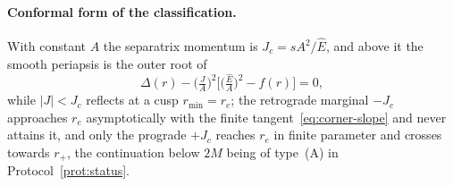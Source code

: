 \documentclass[12pt]{iopart}
\theoremstyle{plain}
\theoremstyle{definition}
\theoremstyle{remark}
\newcommand{\Ehat}{\hat E}
\newcommand{\rp}{r_{+}}
\newcommand{\re}{r_{e}}
\newcommand{\Jc}{J_{c}}
\begin{document}
\paragraph{Conformal form of the classification.} With constant $A$ the separatrix momentum is
$\Jc=sA^2/\Ehat$, and above it the smooth periapsis is the outer root of
\begin{equation}
    \Delta(r)-\Big(\tfrac{J}{A}\Big)^2\Big[\big(\tfrac{\Ehat}{A}\big)^2-f(r)\Big]=0,
    \label{eq:periapsis-root}
\end{equation}
while $|J|<\Jc$ reflects at a cusp $r_{\min}=\re$; the retrograde marginal
$-\Jc$ approaches $\re$ asymptotically with the finite
tangent~\eqref{eq:corner-slope} and never attains it, and only the prograde
$+\Jc$ reaches $\re$ in finite parameter and crosses towards $\rp$, the
continuation below $2M$ being of type~(A) in Protocol~\ref{prot:status}.
\end{document}

